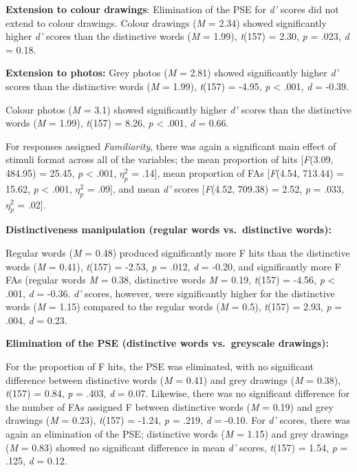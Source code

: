 \documentclass[
  11pt,
]{article}
\begin{document}
\textbf{Extension to colour drawings}: Elimination of the PSE for
\emph{d'} scores did not extend to colour drawings. Colour drawings
(\emph{M} = 2.34) showed significantly higher \emph{d'} scores than the
distinctive words (\emph{M} = 1.99), \emph{t}(157) = 2.30, \emph{p} =
.023, \emph{d} = 0.18.

\textbf{Extension to photos:} Grey photos (\emph{M} = 2.81) showed
significantly higher \emph{d'} scores than the distinctive words
(\emph{M} = 1.99), \emph{t}(157) = -4.95, \emph{p} \textless{} .001,
\emph{d} = -0.39.

Colour photos (\emph{M} = 3.1) showed significantly higher \emph{d'}
scores than the distinctive words (\emph{M} = 1.99), \emph{t}(157) =
8.26, \emph{p} \textless{} .001, \emph{d} = 0.66.

\newpage

For responses assigned \emph{Familiarity}, there was again a significant
main effect of stimuli format across all of the variables; the mean
proportion of hits {[}\emph{F}(3.09, 484.95) = 25.45, \emph{p}
\textless{} .001, \(\eta^2_p\) = .14{]}, mean proportion of FAs
{[}\emph{F}(4.54, 713.44) = 15.62, \emph{p} \textless{} .001,
\(\eta^2_p\) = .09{]}, and mean \emph{d'} scores {[}\emph{F}(4.52,
709.38) = 2.52, \emph{p} = .033, \(\eta^2_p\) = .02{]}.

\textbf{Distinctiveness manipulation (regular words vs.~distinctive
words):}

Regular words (\emph{M} = 0.48) produced significantly more F hits than
the distinctive words (\emph{M} = 0.41), \emph{t}(157) = -2.53, \emph{p}
= .012, \emph{d} = -0.20, and significantly more F FAs (regular words
\emph{M} = 0.38, distinctive words \emph{M} = 0.19, \emph{t}(157) =
-4.56, \emph{p} \textless{} .001, \emph{d} = -0.36. \emph{d'} scores,
however, were significantly higher for the distinctive words (\emph{M} =
1.15) compared to the regular words (\emph{M} = 0.5), \emph{t}(157) =
2.93, \emph{p} = .004, \emph{d} = 0.23.

\textbf{Elimination of the PSE (distinctive words vs.~greyscale
drawings):}

For the proportion of F hits, the PSE was eliminated, with no
significant difference between distinctive words (\emph{M} = 0.41) and
grey drawings (\emph{M} = 0.38), \emph{t}(157) = 0.84, \emph{p} = .403,
\emph{d} = 0.07. Likewise, there was no significant difference for the
number of FAs assigned F between distinctive words (\emph{M} = 0.19) and
grey drawings (\emph{M} = 0.23), \emph{t}(157) = -1.24, \emph{p} = .219,
\emph{d} = -0.10. For \emph{d'} scores, there was again an elimination
of the PSE; distinctive words (\emph{M} = 1.15) and grey drawings
(\emph{M} = 0.83) showed no significant difference in mean \emph{d'}
scores, \emph{t}(157) = 1.54, \emph{p} = .125, \emph{d} = 0.12.
\end{document}
